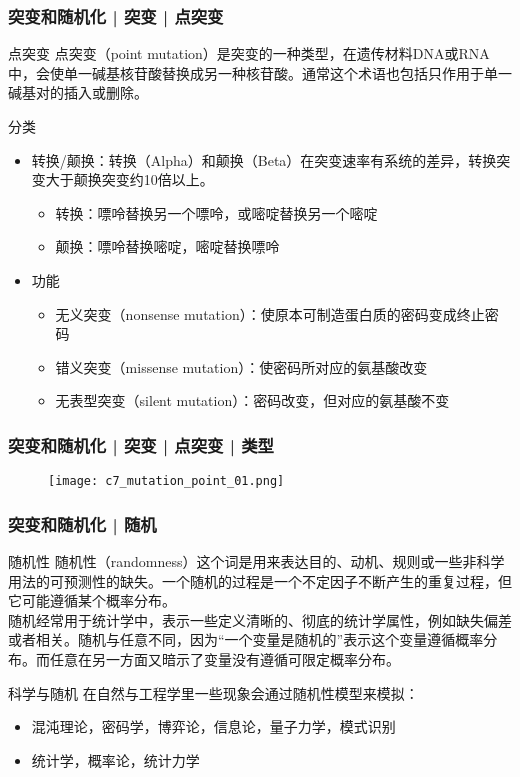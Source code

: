 \begin{frame}
  \frametitle{突变和随机化 | 突变 | \alert{点突变}}
  \begin{block}{点突变}
 点突变（point mutation）是突变的一种类型，在遗传材料DNA或RNA中，会使单一碱基核苷酸替换成另一种核苷酸。通常这个术语也包括只作用于单一碱基对的插入或删除。 
  \end{block}
  \pause
  \begin{block}{分类}
    \begin{itemize}
      \item 转换/颠换：转换（Alpha）和颠换（Beta）在突变速率有系统的差异，转换突变大于颠换突变约10倍以上。
	\begin{itemize}
	  \item 转换：嘌呤替换另一个嘌呤，或嘧啶替换另一个嘧啶
	  \item 颠换：嘌呤替换嘧啶，嘧啶替换嘌呤
	\end{itemize}
      \item 功能
	\begin{itemize}
	  \item 无义突变（nonsense mutation）：使原本可制造蛋白质的密码变成终止密码
	  \item 错义突变（missense mutation）：使密码所对应的氨基酸改变
	  \item 无表型突变（silent mutation）：密码改变，但对应的氨基酸不变
	\end{itemize}
    \end{itemize}
  \end{block}
\end{frame}

\begin{frame}
  \frametitle{突变和随机化 | 突变 | 点突变 | 类型}
  \begin{figure}
    \centering
    \texttt{[image: c7\_mutation\_point\_01.png]}
  \end{figure}
\end{frame}

\begin{frame}
  \frametitle{突变和随机化 | 随机}
  \begin{block}{随机性}
    随机性（randomness）这个词是用来表达目的、动机、规则或一些非科学用法的可预测性的缺失。一个随机的过程是一个不定因子不断产生的重复过程，但它可能遵循某个概率分布。\\
    \vspace{1em}
    随机经常用于统计学中，表示一些定义清晰的、彻底的统计学属性，例如缺失偏差或者相关。随机与任意不同，因为“一个变量是随机的”表示这个变量遵循概率分布。而任意在另一方面又暗示了变量没有遵循可限定概率分布。
  \end{block}
  \pause
  \begin{block}{科学与随机}
    在自然与工程学里一些现象会通过随机性模型来模拟：
    \begin{itemize}
      \item 混沌理论，密码学，博弈论，信息论，量子力学，模式识别
      \item 统计学，概率论，统计力学
    \end{itemize}
  \end{block}
\end{frame}

